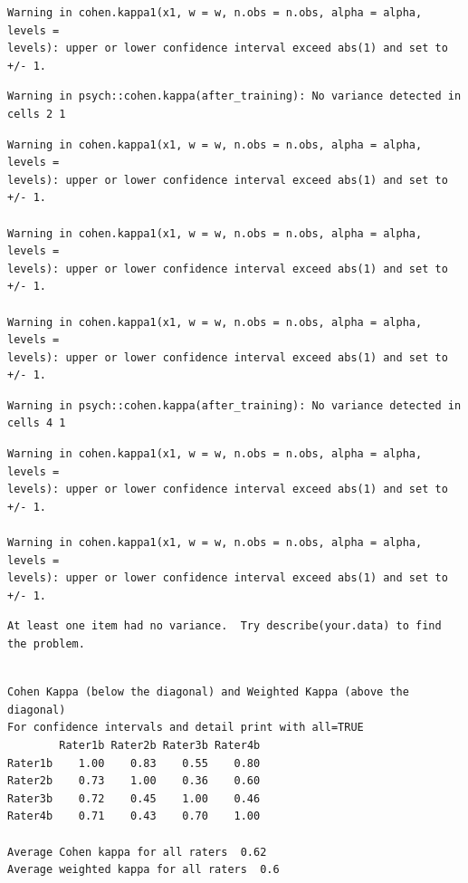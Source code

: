 \documentclass[
  english,
]{book}
\begin{document}
\begin{verbatim}
Warning in cohen.kappa1(x1, w = w, n.obs = n.obs, alpha = alpha, levels =
levels): upper or lower confidence interval exceed abs(1) and set to +/- 1.
\end{verbatim}

\begin{verbatim}
Warning in psych::cohen.kappa(after_training): No variance detected in cells 2 1
\end{verbatim}

\begin{verbatim}
Warning in cohen.kappa1(x1, w = w, n.obs = n.obs, alpha = alpha, levels =
levels): upper or lower confidence interval exceed abs(1) and set to +/- 1.

Warning in cohen.kappa1(x1, w = w, n.obs = n.obs, alpha = alpha, levels =
levels): upper or lower confidence interval exceed abs(1) and set to +/- 1.

Warning in cohen.kappa1(x1, w = w, n.obs = n.obs, alpha = alpha, levels =
levels): upper or lower confidence interval exceed abs(1) and set to +/- 1.
\end{verbatim}

\begin{verbatim}
Warning in psych::cohen.kappa(after_training): No variance detected in cells 4 1
\end{verbatim}

\begin{verbatim}
Warning in cohen.kappa1(x1, w = w, n.obs = n.obs, alpha = alpha, levels =
levels): upper or lower confidence interval exceed abs(1) and set to +/- 1.

Warning in cohen.kappa1(x1, w = w, n.obs = n.obs, alpha = alpha, levels =
levels): upper or lower confidence interval exceed abs(1) and set to +/- 1.
\end{verbatim}

\begin{verbatim}
At least one item had no variance.  Try describe(your.data) to find the problem.
\end{verbatim}

\begin{verbatim}

Cohen Kappa (below the diagonal) and Weighted Kappa (above the diagonal) 
For confidence intervals and detail print with all=TRUE
        Rater1b Rater2b Rater3b Rater4b
Rater1b    1.00    0.83    0.55    0.80
Rater2b    0.73    1.00    0.36    0.60
Rater3b    0.72    0.45    1.00    0.46
Rater4b    0.71    0.43    0.70    1.00

Average Cohen kappa for all raters  0.62
Average weighted kappa for all raters  0.6
\end{verbatim}
\end{document}
